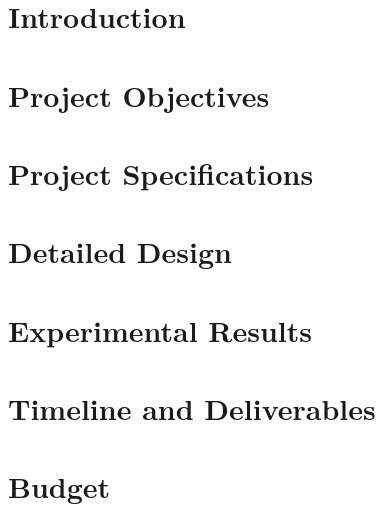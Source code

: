 \documentclass[letter]{article}
\begin{document}


\tableofcontents
\pagebreak


\pagebreak


\pagebreak

\section{Introduction}
\pagebreak

\section{Project Objectives}
\pagebreak

\section{Project Specifications}
\pagebreak

\section{Detailed Design}
\pagebreak

\section{Experimental Results}
\pagebreak

\section{Timeline and Deliverables}
\pagebreak

\section{Budget}
\end{document}
